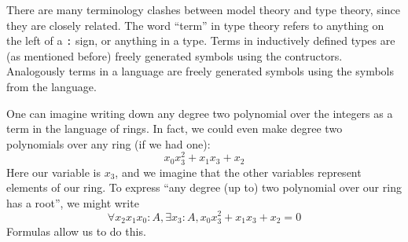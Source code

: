 \begin{rmk}
  There are many terminology clashes between model theory and type theory,
  since they are closely related.
  The word ``term'' in type theory refers to anything on the left of a \texttt{:} sign,
  or anything in a type.
  Terms in inductively defined types are (as mentioned before)
  freely generated symbols using the contructors.
  Analogously terms in a language are freely generated symbols using
  the symbols from the language.
\end{rmk}

One can imagine writing down any degree two polynomial over the integers
as a term in the language of rings.
In fact, we could even make degree two polynomials over any ring (if we had one):
\[ x_{0} x_{3}^{2} + x_{1} x_{3} + x_{2} \]
Here our variable is $x_{3}$, and we imagine that the other variables represent
elements of our ring.
To express ``any degree (up to) two polynomial over our ring has a root'',
we might write
\[ \forall x_{2} x_{1} x_{0} : A, \exists x_{3} : A, x_{0} x_{3}^{2} + x_{1} x_{3} + x_{2} = 0 \]
Formulas allow us to do this.

